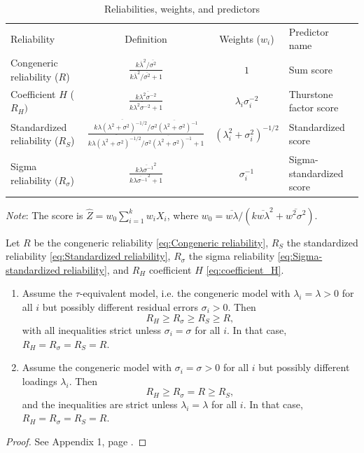 \documentclass[twoside]{article}
\begin{document}
\begin{table}
\label{tab:reliabilities}
\noindent \begin{centering}
\caption{Reliabilities, weights, and predictors}
\begin{tabular}{lccl}
\toprule
 Reliability & Definition & Weights ($w_{i}$) & Predictor name\\
 \cmidrule{1-4}
Congeneric reliability ($R$) & $\frac{k\overline{\lambda}^{2}/\overline{\sigma^{2}}}{k\overline{\lambda}^{2}/\overline{\sigma^{2}}+1}$ & $1$ & Sum score \\[2ex]
Coefficient $H$ ($R_{H})$ & $\frac{k\overline{\lambda^{2}\sigma^{-2}}}{k\overline{\lambda^{2}\sigma^{-2}}+1}$ & $\lambda_{i}\sigma_{i}^{-2}$ & Thurstone factor score \\[2ex]
Standardized reliability ($R_{S}$) & $\frac{k\overline{\lambda(\lambda^{2}+\sigma^{2})^{-1/2}}/\overline{\sigma^{2}(\lambda^{2}+\sigma^{2})^{-1}}}{k\overline{\lambda(\lambda^{2}+\sigma^{2})^{-1/2}}/\overline{\sigma^{2}(\lambda^{2}+\sigma^{2})^{-1}}+1}$ & $(\lambda_{i}^{2}+\sigma_{i}^{2})^{-1/2}$ & Standardized score \\[2ex]
Sigma reliability $(R_{\sigma}$) & $\frac{k\overline{\lambda\sigma^{-1}}^{2}}{k\overline{\lambda\sigma^{-1}}^{2}+1}$ & $\sigma_{i}^{-1}$ & Sigma-standardized score \\[2ex]
\bottomrule
\end{tabular}
\par\end{centering}
\vskip7.0pt
\textit{Note}: The score is $\hat{Z} = w_{0}\sum_{i=1}^{k}w_iX_{i}$, where $w_0 = \overline{w\lambda}/(k\overline{w\lambda}^{2}+\overline{w^{2}\sigma^{2}})$.
\end{table}


\begin{thm}
\label{thm:Properties of three} Let $ R$ be the congeneric
reliability \eqref{eq:Congeneric reliability}, $ R_{S}$ the standardized reliability \eqref{eq:Standardized reliability},
$ R_{\sigma}$ the sigma reliability \eqref{eq:Sigma-standardized reliability},
and $ R_{H}$ coefficient $H$ \eqref{eq:coefficient_H}. 

\begin{enumerate}[label=(\roman*)]
\item Assume the $\tau$-equivalent model,
i.e. the congeneric model with $\lambda_{i}=\lambda>0$ for all $i$
but possibly different residual errors $\sigma_{i}>0$. Then
\[
 R_{H}\geq R_{\sigma}\geq R_{S}\geq R,
\]
with all inequalities strict unless $\sigma_{i}=\sigma$ for all
$i$. In that case, $ R_{H} =  R_{\sigma} =  R_{S} =  R$.
\item Assume the congeneric model with $\sigma_i = \sigma > 0$ for all $i$ but possibly different loadings $\lambda_i$. Then
\[
 R_{H}\geq R_{\sigma}= R\geq R_{S},
\]
and the inequalities are strict unless $\lambda_{i}=\lambda$ for all
$i$. In that case, $ R_{H} =  R_{\sigma} =  R_{S} =  R$.

\end{enumerate}

\end{thm}
\begin{proof}
See Appendix 1, page \pageref{proof:Properties}.
\end{proof}
\end{document}
